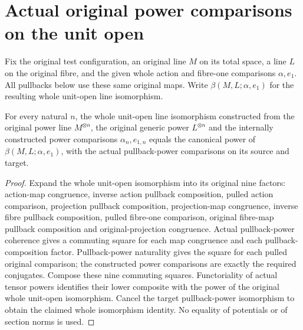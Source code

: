\section{Actual original power comparisons on the unit open}

Fix the original test configuration, an original line $M$ on its total
space, a line $L$ on the original fibre, and the given whole action and
fibre-one comparisons $\alpha,e_1$.  All pullbacks below use these same
original maps.  Write $\beta(M,L;\alpha,e_1)$ for the resulting whole
unit-open line isomorphism.

\begin{lemma}
\label{lem:native-tc-nef-fs-unit-open-power-coherence}
\leanok
{}
For every natural $n$, the whole unit-open line isomorphism constructed
from the original power line $M^{\otimes n}$, the original generic power
$L^{\otimes n}$ and the internally constructed power comparisons
$\alpha_n,e_{1,n}$ equals the canonical power of
$\beta(M,L;\alpha,e_1)$, with the actual pullback-power comparisons on
its source and target.
\end{lemma}
\begin{proof}
Expand the whole unit-open isomorphism into its original nine factors:
action-map congruence, inverse action pullback composition, pulled action
comparison, projection pullback composition, projection-map congruence,
inverse fibre pullback composition, pulled fibre-one comparison, original
fibre-map pullback composition and original-projection congruence.
Actual pullback-power coherence gives a commuting square for each map
congruence and each pullback-composition factor.  Pullback-power
naturality gives the square for each pulled original comparison; the
constructed power comparisons are exactly the required conjugates.
Compose these nine commuting squares.  Functoriality of actual tensor
powers identifies their lower composite with the power of the original
whole unit-open isomorphism.  Cancel the target pullback-power
isomorphism to obtain the claimed whole isomorphism identity.
No equality of potentials or of section norms is used.
\end{proof}

